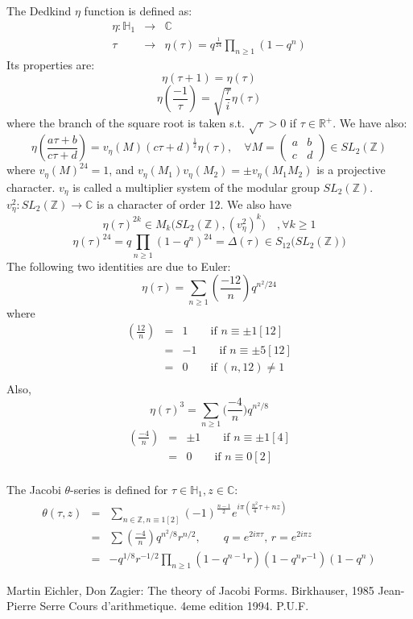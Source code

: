\documentclass[10pt,a4paper]{article}
\begin{document}
The Dedkind $\eta$ function is defined as:
\begin{eqnarray*}
\eta:\mathbb{H}_1&\rightarrow&\mathbb{C}\\
\tau&\rightarrow&\eta(\tau)=q^{\frac{1}{24}}\prod_{n\geq1}(1-q^n)
\end{eqnarray*}
Its properties are:
\[\eta(\tau+1)=\eta(\tau)\]
\[\eta\left(\frac{-1}{\tau}\right)=\sqrt{\frac{\tau}{i}}\eta(\tau)\]
where the branch of the square root is taken s.t. $\sqrt{\tau}>0$ if $\tau\in\mathbb{R}^+$.
We have also:
\[\eta\left(\frac{a\tau+b}{c\tau+d}\right)=v_\eta(M)(c\tau+d)^\frac{1}{2}\eta(\tau),\quad \forall M=\left(\begin{array}{cc}a&b\\c&d\end{array}\right)\in SL_2(\mathbb{Z})\]
where $v_\eta(M)^{24}=1$, and $v_\eta(M_1)v_\eta(M_2)=\pm v_\eta(M_1M_2)$ is a projective character. $v_\eta$ is called a multiplier system of the modular group $SL_2(\mathbb{Z})$.\\ $v_\eta^2:SL_2(\mathbb{Z})\rightarrow\mathbb{C}$ is a character of order 12. We also have\\
\[\eta(\tau)^{2k}\in M_k\big(SL_2(\mathbb{Z}), (v_\eta^2)^k\big)\quad, \forall k\geq1\]
\[\eta(\tau)^{24}=q\prod_{n\geq1}(1-q^n)^{24}=\Delta(\tau)\in S_{12}\big(SL_2(\mathbb{Z})\big)\]
The following two identities are due to Euler:
\[\eta(\tau)=\sum_{n\geq1}\left(\frac{-12}{n}\right)q^{n^2/24}\]
where 
\begin{eqnarray*}
\left(\frac{12}{n}\right)&=&1\qquad\textrm{if }n\equiv\pm1 [12]\\
&=&-1\qquad\textrm{if }n\equiv\pm5 [12]\\
&=&0\qquad\textrm{if }(n,12)\neq1\\
\end{eqnarray*}
Also,
\[\eta(\tau)^3=\sum_{n\geq1}\big(\frac{-4}{n}\big)q^{n^2/8}\]
\begin{eqnarray*}
\left(\frac{-4}{n}\right)&=&\pm1\qquad\textrm{if }n\equiv\pm1 [4]\\
&=&0\qquad\textrm{if }n\equiv0[2]\\
\end{eqnarray*}

The Jacobi $\theta$-series is defined for $\tau\in\mathbb{H}_1,z\in\mathbb{C}$:
\begin{eqnarray*}
\theta(\tau,z)&=&\sum_{n\in\mathbb{Z},n\equiv1[2]}(-1)^\frac{n-1}{2}e^{i\pi(\frac{n^2}{4}\tau+nz)}\\
&=&\sum\left(\frac{-4}{n}\right)q^{n^2/8}r^{n/2},\qquad q=e^{2i\pi\tau},\, r= e^{2i\pi z}\\
&=&-q^{1/8}r^{-1/2}\prod_{n\geq1}(1-q^{n-1}r)(1-q^nr^{-1})(1-q^n)
\end{eqnarray*}

\begin{thebibliography}{1}
 Martin Eichler, Don Zagier: The theory of Jacobi Forms. Birkhauser, 1985
Jean-Pierre Serre Cours d'arithmetique. 4eme edition 1994. P.U.F.
\end{thebibliography}
\end{document}
